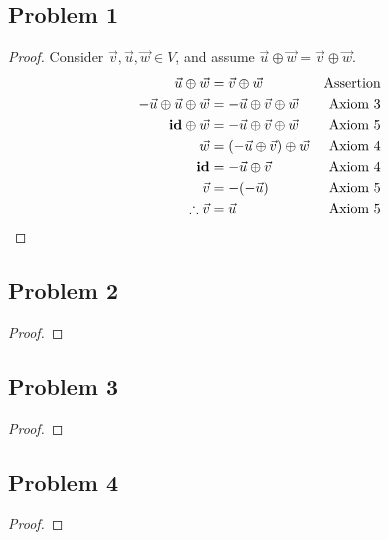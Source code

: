 




\subsection*{Problem 1}
\begin{proof}
  Consider $\vec{v}, \vec{u}, \vec{w} \in V$, and assume $\vec{u} \oplus \vec{w} = \vec{v} \oplus \vec{w}$.
  \begin{align*}
    \vec{u} \oplus \vec{w}                 & = \vec{v} \oplus \vec{w}                   & \text{Assertion} \\
    -\vec{u} \oplus \vec{u} \oplus \vec{w} & = -\vec{u} \oplus \vec{v} \oplus \vec{w}   & \text{Axiom 3}   \\
    \textbf{id} \oplus \vec{w}                & = -\vec{u} \oplus \vec{v} \oplus \vec{w}   & \text{Axiom 5}   \\
    \vec{w}                                & = (-\vec{u} \oplus \vec{v}) \oplus \vec{w} & \text{Axiom 4}   \\
    \textbf{id}                               & = -\vec{u} \oplus \vec{v}                  & \text{Axiom 4}   \\
    \vec{v}                                & = -(-\vec{u})                              & \text{Axiom 5}   \\
    \therefore \vec{v}                     & = \vec{u}                                  & \text{Axiom 5}
  \end{align*}
\end{proof}

\subsection*{Problem 2}
\begin{proof}
\end{proof}

\subsection*{Problem 3}
\begin{proof}
\end{proof}

\subsection*{Problem 4}
\begin{proof}
\end{proof}
